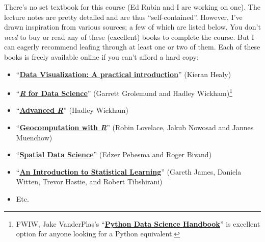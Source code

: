 \documentclass[12]{article}
\begin{document}
There's no set textbook for this course (Ed Rubin and I are working on one). The lecture notes are pretty detailed and are thus ``self-contained''. However, I've drawn inspiration from various sources; a few of which are listed below. You don't \textit{need} to buy or read any of these (excellent) books to complete the course. But I can eagerly recommend leafing through at least one or two of them. Each of these books is freely available online if you can't afford a hard copy:
%
\begin{itemize}
  \item ``\href{http://socviz.co/}{\textbf{Data Visualization: A practical introduction}}'' (Kieran Healy)
	\item ``\href{http://r4ds.had.co.nz}{\textbf{\textit{R} for Data Science}}'' (Garrett Grolemund and Hadley Wickham)\footnote{FWIW, Jake VanderPlas's ``\href{https://jakevdp.github.io/PythonDataScienceHandbook/}{\textbf{Python Data Science Handbook}}'' is excellent option for anyone looking for a Python equivalent.}
   \item ``\href{https://adv-r.hadley.nz/}{\textbf{Advanced \textit{R}}}'' (Hadley Wickham)
   \item ``\href{https://geocompr.robinlovelace.net/}{\textbf{Geocomputation with \textit{R}}}'' (Robin Lovelace, Jakub Nowosad and Jannes Muenchow)
   \item ``\href{https://keen-swartz-3146c4.netlify.app/}{\textbf{Spatial Data Science}}'' (Edzer Pebesma and Roger Bivand)
   \item ``\href{https://statlearning.com}{\textbf{An Introduction to Statistical Learning}}'' (Gareth James, Daniela Witten, Trevor Hastie, and Robert Tibshirani)
   \item Etc.
\end{itemize}
\end{document}
